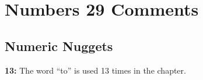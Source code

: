 \section{Numbers 29 Comments}

\subsection{Numeric Nuggets}
\textbf{13: } The word ``to'' is used 13 times in the chapter.

